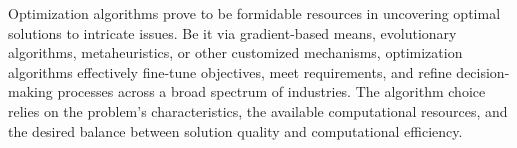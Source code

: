 Optimization algorithms prove to be formidable resources in uncovering optimal solutions to intricate issues. Be it via gradient-based means, evolutionary algorithms, metaheuristics, or other customized mechanisms, optimization algorithms effectively fine-tune objectives, meet requirements, and refine decision-making processes across a broad spectrum of industries. The algorithm choice relies on the problem's characteristics, the available computational resources, and the desired balance between solution quality and computational efficiency.

